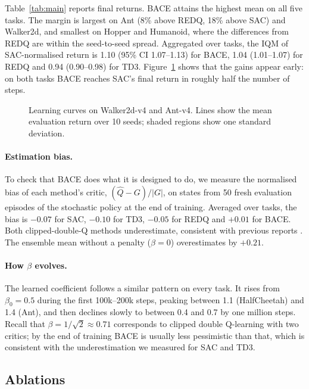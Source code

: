 \documentclass[10pt,twocolumn,letterpaper]{article}
\newcommand{\method}{\textsc{BACE}}
\begin{document}
Table~\ref{tab:main} reports final returns. \method{} attains the highest mean on all five tasks. The margin is largest on Ant (8\% above REDQ, 18\% above SAC) and Walker2d, and smallest on Hopper and Humanoid, where the differences from REDQ are within the seed-to-seed spread. Aggregated over tasks, the IQM of SAC-normalised return is 1.10 (95\% CI 1.07--1.13) for \method, 1.04 (1.01--1.07) for REDQ and 0.94 (0.90--0.98) for TD3. Figure~\ref{fig:curves} shows that the gains appear early: on both tasks \method{} reaches SAC's final return in roughly half the number of steps.

\begin{figure}[t]
  \centering
  
  \caption{Learning curves on Walker2d-v4 and Ant-v4. Lines show the mean evaluation return over 10 seeds; shaded regions show one standard deviation.}
  \label{fig:curves}
\end{figure}

\paragraph{Estimation bias.} To check that \method{} does what it is designed to do, we measure the normalised bias of each method's critic, $(\hat Q - G)/|G|$, on states from 50 fresh evaluation episodes of the stochastic policy at the end of training. Averaged over tasks, the bias is $-0.07$ for SAC, $-0.10$ for TD3, $-0.05$ for REDQ and $+0.01$ for \method. Both clipped-double-Q methods underestimate, consistent with previous reports \citep{kuznetsov2020,chen2021}. The ensemble mean without a penalty ($\beta=0$) overestimates by $+0.21$.

\paragraph{How $\beta$ evolves.} The learned coefficient follows a similar pattern on every task. It rises from $\beta_0=0.5$ during the first 100k--200k steps, peaking between 1.1 (HalfCheetah) and 1.4 (Ant), and then declines slowly to between 0.4 and 0.7 by one million steps. Recall that $\beta=1/\sqrt{2}\approx0.71$ corresponds to clipped double Q-learning with two critics; by the end of training \method{} is usually less pessimistic than that, which is consistent with the underestimation we measured for SAC and TD3.

\subsection{Ablations}
\label{sec:ablations}
\end{document}
